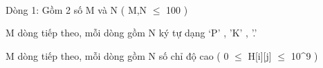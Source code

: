  

Dòng 1: Gồm 2 số M và N ( M,N  $\le$  100 )

M dòng tiếp theo, mỗi dòng gồm N ký tự dạng ‘P’ , ’K’ , ’.’

M dòng tiếp theo, mỗi dòng gồm N số chỉ độ cao ( 0  $\le$  H[i][j]  $\le$  10^9 )

 

 

 